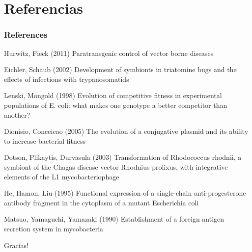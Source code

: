 \documentclass{beamer}
\begin{document}

\section{Referencias}





\begin{frame}
\frametitle{References}
\scriptsize{
\begin{thebibliography}{99} %
 Hurwitz, Fieck (2011)
\newblock Paratransgenic control of vector borne diseases

 Eichler, Schaub (2002)
\newblock Development of symbionts in triatomine bugs and the effects of infections with trypanosomatids

 Lenski, Mongold (1998)
\newblock Evolution of competitive fitness in experimental populations of E. coli: what makes one genotype a better competitor than another?

 Dionisio, Conceicao (2005)
\newblock The evolution of a conjugative plasmid and its ability to increase bacterial fitness

 Dotson, Plikaytis, Durvasula (2003)
\newblock Transformation of Rhodococcus rhodnii, a symbiont of the Chagas disease vector Rhodnius prolixus, with integrative elements of the L1 mycobacteriophage

 He, Hamon, Liu (1995)
\newblock Functional expression of a single-chain anti-progesterone antibody fragment in the cytoplasm of a mutant Escherichia coli

 Matsuo, Yamaguchi, Yamazaki (1990)
\newblock Establishment of a foreign antigen secretion system in mycobacteria

\end{thebibliography}
}
\end{frame}


\begin{frame}
\Huge{\centerline{Gracias!}}
\end{frame}

\end{document}
